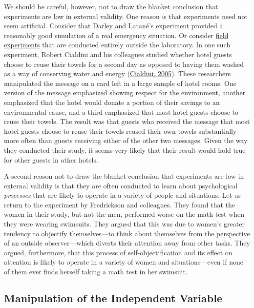 \documentclass[
]{krantz}
\begin{document}
We should be careful, however, not to draw the blanket conclusion that experiments are low in external validity. One reason is that experiments need not seem artificial. Consider that Darley and Latané's experiment provided a reasonably good simulation of a real emergency situation. Or consider \protect\hyperlink{field-experiments}{field experiments} that are conducted entirely outside the laboratory. In one such experiment, Robert Cialdini and his colleagues studied whether hotel guests choose to reuse their towels for a second day as opposed to having them washed as a way of conserving water and energy (\protect\hyperlink{ref-cialdini2005don}{Cialdini, 2005}). These researchers manipulated the message on a card left in a large sample of hotel rooms. One version of the message emphasized showing respect for the environment, another emphasized that the hotel would donate a portion of their savings to an environmental cause, and a third emphasized that most hotel guests choose to reuse their towels. The result was that guests who received the message that most hotel guests choose to reuse their towels reused their own towels substantially more often than guests receiving either of the other two messages. Given the way they conducted their study, it seems very likely that their result would hold true for other guests in other hotels.

A second reason not to draw the blanket conclusion that experiments are low in external validity is that they are often conducted to learn about psychological \emph{processes} that are likely to operate in a variety of people and situations. Let us return to the experiment by Fredrickson and colleagues. They found that the women in their study, but not the men, performed worse on the math test when they were wearing swimsuits. They argued that this was due to women's greater tendency to objectify themselves---to think about themselves from the perspective of an outside observer---which diverts their attention away from other tasks. They argued, furthermore, that this process of self-objectification and its effect on attention is likely to operate in a variety of women and situations---even if none of them ever finds herself taking a math test in her swimsuit.

\hypertarget{manipulation-of-the-independent-variable}{%
\subsection*{Manipulation of the Independent Variable}\label{manipulation-of-the-independent-variable}}
\end{document}

